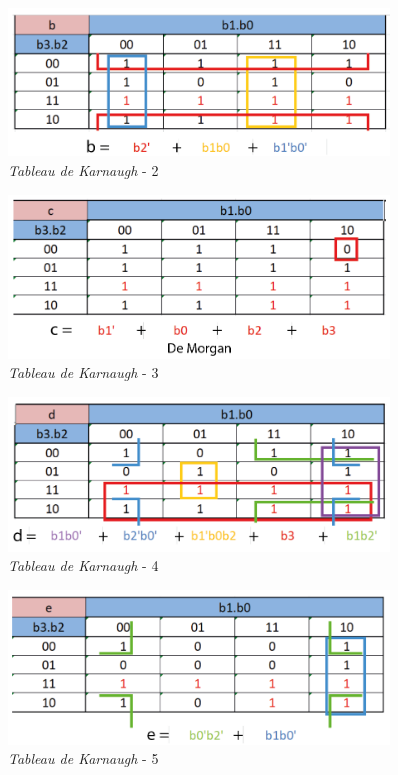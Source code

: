\begin{figure}[h!]
    \centering
    \includegraphics[width=0.9\textwidth]{IMG/tab_de_K_2.png}
    \caption{\textit{Tableau de Karnaugh} - 2}
    \label{fig:colorpicker}
\end{figure}
\medskip

\begin{figure}[h!]
    \centering
    \includegraphics[width=0.9\textwidth]{IMG/tab_de_K_3.png}
    \caption{\textit{Tableau de Karnaugh} - 3}
    \label{fig:colorpicker}
\end{figure}
\newpage

\begin{figure}[h!]
    \centering
    \includegraphics[width=0.9\textwidth]{IMG/tab_de_K_4.png}
    \caption{\textit{Tableau de Karnaugh} - 4}
    \label{fig:colorpicker}
\end{figure}
\medskip

\begin{figure}[h!]
    \centering
    \includegraphics[width=0.9\textwidth]{IMG/tab_de_K_5.png}
    \caption{\textit{Tableau de Karnaugh} - 5}
    \label{fig:colorpicker}
\end{figure}
\medskip

